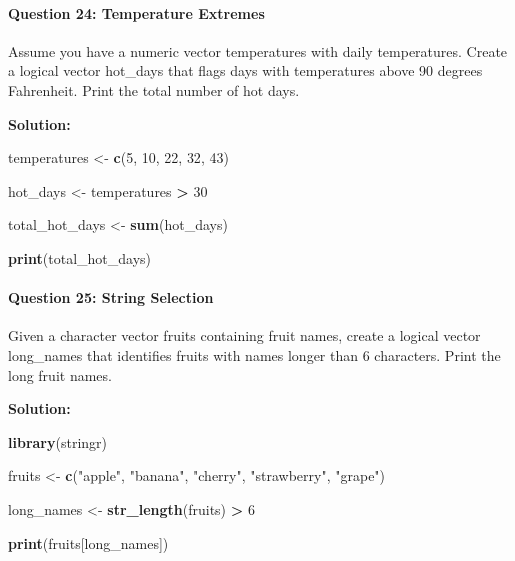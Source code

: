 \documentclass[
]{article}
\newenvironment{Shaded}{\begin{snugshade}}{\end{snugshade}}
\newcommand{\DecValTok}[1]{\textcolor[rgb]{0.00,0.00,0.81}{#1}}
\newcommand{\FunctionTok}[1]{\textcolor[rgb]{0.13,0.29,0.53}{\textbf{#1}}}
\newcommand{\NormalTok}[1]{#1}
\newcommand{\OtherTok}[1]{\textcolor[rgb]{0.56,0.35,0.01}{#1}}
\newcommand{\SpecialCharTok}[1]{\textcolor[rgb]{0.81,0.36,0.00}{\textbf{#1}}}
\newcommand{\StringTok}[1]{\textcolor[rgb]{0.31,0.60,0.02}{#1}}
\begin{document}
\hypertarget{question-24-temperature-extremes}{%
\paragraph{Question 24: Temperature
Extremes}\label{question-24-temperature-extremes}}

Assume you have a numeric vector temperatures with daily temperatures.
Create a logical vector hot\_days that flags days with temperatures
above 90 degrees Fahrenheit. Print the total number of hot days.

\textbf{Solution:}

\begin{Shaded}
\begin{Highlighting}[]
\NormalTok{temperatures }\OtherTok{\textless{}{-}} \FunctionTok{c}\NormalTok{(}\DecValTok{5}\NormalTok{, }\DecValTok{10}\NormalTok{, }\DecValTok{22}\NormalTok{, }\DecValTok{32}\NormalTok{, }\DecValTok{43}\NormalTok{)}

\NormalTok{hot\_days }\OtherTok{\textless{}{-}}\NormalTok{ temperatures }\SpecialCharTok{\textgreater{}} \DecValTok{30}

\NormalTok{total\_hot\_days }\OtherTok{\textless{}{-}} \FunctionTok{sum}\NormalTok{(hot\_days)}

\FunctionTok{print}\NormalTok{(total\_hot\_days)}
\end{Highlighting}
\end{Shaded}

\hypertarget{question-25-string-selection}{%
\paragraph{Question 25: String
Selection}\label{question-25-string-selection}}

Given a character vector fruits containing fruit names, create a logical
vector long\_names that identifies fruits with names longer than 6
characters. Print the long fruit names.

\textbf{Solution:}

\begin{Shaded}
\begin{Highlighting}[]
\FunctionTok{library}\NormalTok{(stringr)}

\NormalTok{fruits }\OtherTok{\textless{}{-}} \FunctionTok{c}\NormalTok{(}\StringTok{"apple"}\NormalTok{, }\StringTok{"banana"}\NormalTok{, }\StringTok{"cherry"}\NormalTok{, }\StringTok{"strawberry"}\NormalTok{, }\StringTok{"grape"}\NormalTok{)}

\NormalTok{long\_names }\OtherTok{\textless{}{-}} \FunctionTok{str\_length}\NormalTok{(fruits) }\SpecialCharTok{\textgreater{}} \DecValTok{6}

\FunctionTok{print}\NormalTok{(fruits[long\_names])}
\end{Highlighting}
\end{Shaded}
\end{document}
